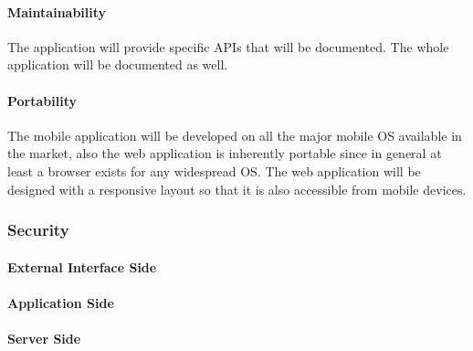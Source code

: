 \documentclass[a4paper,12pt]{article}%
\begin{document}
\paragraph{Maintainability} The application will provide specific APIs that will be documented. The whole application will be documented as well.
\paragraph{Portability} The mobile application will be developed on all the major mobile OS available in the market, also the web application is inherently portable since in general at least a browser exists for any widespread OS. The web application will be designed with a responsive layout so that it is also accessible from mobile devices.
\subsubsection{Security}
\paragraph{External Interface Side}
\paragraph{Application Side}
\paragraph{Server Side}
\end{document}
